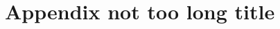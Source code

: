 \documentclass[../main/thesis_msc.tex]{subfiles}
\begin{document}
    \chapter{Appendix not too long title}
    \Blindtext  %
\end{document}
